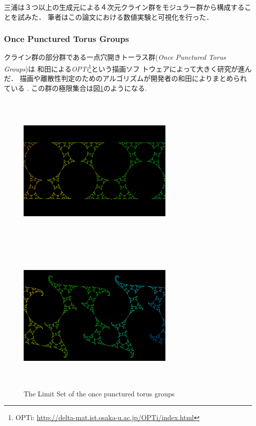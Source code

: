 三浦は３つ以上の生成元による４次元クライン群をモジュラー群から構成するこ
とを試みた\cite{miura2015master}．
筆者はこの論文における数値実験と可視化を行った．

\subsubsection{Once Punctured Torus Groups}

クライン群の部分群である一点穴開きトーラス群({\it Once Punctured Torus Groups})は
和田による{\it OPTi}\footnote{OPTi:
\url{http://delta-mat.ist.osaka-u.ac.jp/OPTi/index.html}}という描画ソフ
トウェアによって大きく研究が進んだ．
描画や離散性判定のためのアルゴリズムが開発者の和田によりまとめられている
\cite{wada2003optiDrawingLimit}\cite{wada2006optiDiscreteness}.
この群の極限集合は図\ref{fig:opt}のようになる.

 \begin{figure}[htbp]
  \begin{minipage}{0.5\hsize}
   \center
   \includegraphics[width=3in, height=3in,
   keepaspectratio]{../img/klein/opt1N.pdf}
   \subcaption{}
  \end{minipage}
  \begin{minipage}{0.5\hsize}
   \center
   \includegraphics[width=3in, height=3in,
   keepaspectratio]{../img/klein/opt2N.pdf}
   \subcaption{}
  \end{minipage}
  \caption{The Limit Set of the once punctured torus groups}
  \label{fig:opt}
 \end{figure}

